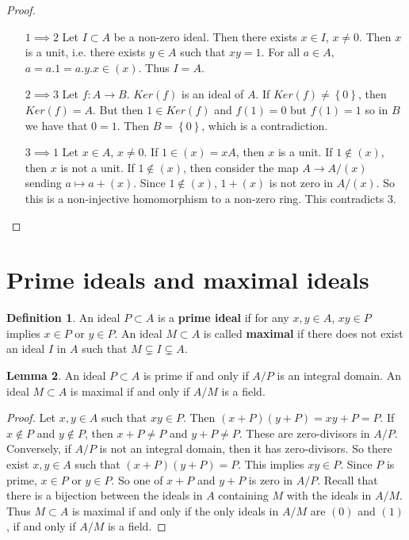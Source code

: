 \documentclass{article}
\newcommand{\rb}[1]{\left( #1 \right)}
\newcommand{\cb}[1]{\left\{ #1 \right\}}
\theoremstyle{definition}\newtheorem{definition}{Definition}[section]
\theoremstyle{definition}\newtheorem{remark}[definition]{Remark}
\theoremstyle{definition}\newtheorem*{example}{Example}
\theoremstyle{definition}\newtheorem*{note}{Note}
\newtheorem{lemma}[definition]{Lemma}
\begin{document}
\begin{proof}
\hfill
\begin{itemize}[leftmargin=0.5in]
\item[$ 1 \implies 2 $] Let $ I \subset A $ be a non-zero ideal. Then there exists $ x \in I $, $ x \ne 0 $. Then $ x $ is a unit, i.e. there exists $ y \in A $ such that $ xy = 1 $. For all $ a \in A $, $ a = a.1 = a.y.x \in \rb{x} $. Thus $ I = A $.
\item[$ 2 \implies 3 $] Let $ f : A \to B $. $ Ker\rb{f} $ is an ideal of $ A $. If $ Ker\rb{f} \ne \cb{0} $, then $ Ker\rb{f} = A $. But then $ 1 \in Ker\rb{f} $ and $ f\rb{1} = 0 $ but $ f\rb{1} = 1 $ so in $ B $ we have that $ 0 = 1 $. Then $ B = \cb{0} $, which is a contradiction.
\item[$ 3 \implies 1 $] Let $ x \in A $, $ x \ne 0 $. If $ 1 \in \rb{x} = xA $, then $ x $ is a unit. If $ 1 \notin \rb{x} $, then $ x $ is not a unit. If $ 1 \notin \rb{x} $, then consider the map $ A \to A / \rb{x} $ sending $ a \mapsto a + \rb{x} $. Since $ 1 \notin \rb{x} $, $ 1 + \rb{x} $ is not zero in $ A / \rb{x} $. So this is a non-injective homomorphism to a non-zero ring. This contradicts $ 3 $.
\end{itemize}
\end{proof}

\section{Prime ideals and maximal ideals}

\begin{definition}
An ideal $ P \subset A $ is a \textbf{prime ideal} if for any $ x, y \in A $, $ xy \in P $ implies $ x \in P $ or $ y \in P $. An ideal $ M \subset A $ is called \textbf{maximal} if there does not exist an ideal $ I $ in $ A $ such that $ M \subsetneq I \subsetneq A $.
\end{definition}

\begin{lemma}
An ideal $ P \subset A $ is prime if and only if $ A / P $ is an integral domain. An ideal $ M \subset A $ is maximal if and only if $ A / M $ is a field.
\end{lemma}

\begin{proof}
Let $ x, y \in A $ such that $ xy \in P $. Then $ \rb{x + P}\rb{y + P} = xy + P = P $. If $ x \notin P $ and $ y \notin P $, then $ x + P \ne P $ and $ y + P \ne P $. These are zero-divisors in $ A / P $. Conversely, if $ A / P $ is not an integral domain, then it has zero-divisors. So there exist $ x, y \in A $ such that $ \rb{x + P}\rb{y + P} = P $. This implies $ xy \in P $. Since $ P $ is prime, $ x \in P $ or $ y \in P $. So one of $ x + P $ and $ y + P $ is zero in $ A / P $. Recall that there is a bijection between the ideals in $ A $ containing $ M $ with the ideals in $ A / M $. Thus $ M \subset A $ is maximal if and only if the only ideals in $ A / M $ are $ \rb{0} $ and $ \rb{1} $, if and only if $ A / M $ is a field.
\end{proof}
\end{document}
